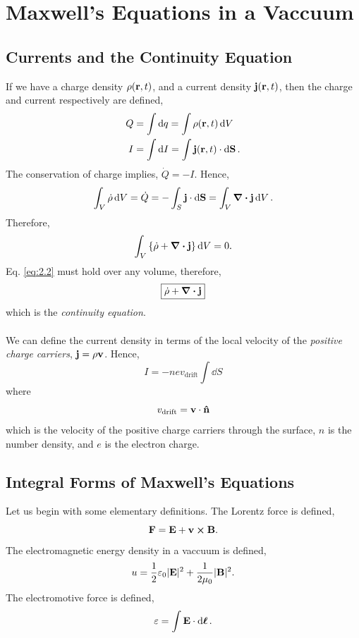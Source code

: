 \documentclass{book}
\begin{document}
\chapter{Maxwell's Equations in a Vaccuum}
\section{Currents and the Continuity Equation}
If we have a charge density $\rho(\vb{r},t)$, and a current density $\vb{j}(\vb{r},t)$, then the charge and current respectively are defined,
\begin{align}
	Q &= \int \dd{q} = \int\rho(\vb{r},t)\dd{V} \\
	I &= \int \dd{I} = \int \vb{j}(\vb{r},t)\cdot \dd{\vb{S}}.
\end{align}
The conservation of charge implies, $\Dot{Q} = -I$. Hence,
\begin{equation}
	\int_V \Dot{\rho} \dd{V} = \Dot{Q} = - \int_S\vb{j}\cdot\dd{\vb{S}} = \int_V\div{\vb{j}}\dd{V}.
\end{equation}
Therefore,
\begin{equation}
	\int_V\left\{\Dot{\rho} + \div{\vb{j}}\right\}\dd{V} = 0. \label{eq:2.2}
\end{equation}
Eq. \eqref{eq:2.2} must hold over any volume, therefore,
\begin{equation}
	\boxed{\Dot{\rho} + \div{\vb{j}}}
\end{equation}
which is the \textit{continuity equation}.
\\\\
We can define the current density in terms of the local velocity of the \textit{positive charge carriers}, $\vb{j} = \rho\vb{v}$. Hence,
\begin{equation}
	I = -nev_{\text{drift}} \int\dd{S}
\end{equation}
where
\begin{equation}
	v_{\text{drift}} = \vb{v}\cdot\vu{n}
\end{equation}
which is the velocity of the positive charge carriers through the surface, $n$ is the number density, and $e$ is the electron charge.
\section{Integral Forms of Maxwell's Equations}
Let us begin with some elementary definitions. The Lorentz force is defined,
\begin{equation}
	\vb{F} = 	\vb{E} + \vb{v}\cross\vb{B}.
\end{equation}
The electromagnetic energy density in a vaccuum is defined,
\begin{equation}
	u = \frac{1}{2}\varepsilon_0 |\vb{E}|^2 + \frac{1}{2\mu_0}|\vb{B}|^2.
\end{equation}
The electromotive force is defined,
\begin{equation}
	\varepsilon = \int \vb{E}\cdot \dd{\vb*{\ell}}.
\end{equation}
\end{document}
